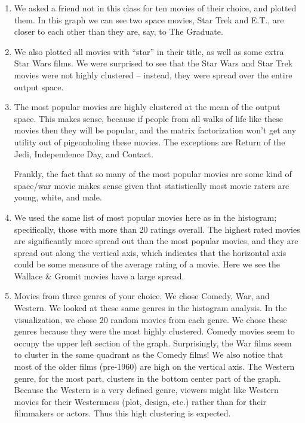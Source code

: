 \begin{enumerate}
    \item We asked a friend not in this class for ten movies of their choice, and plotted them. In this graph we can see two space movies, Star Trek and E.T., are closer to each other than they are, say, to The Graduate.
    \item We also plotted all movies with ``star'' in their title, as well as some extra Star Wars films. We were surprised to see that the Star Wars and Star Trek movies were not highly clustered -- instead, they were spread over the entire output space.
    \newpage
    \item The most popular movies are highly clustered at the mean of the output space. This makes sense, because if people from all walks of life like these movies then they will be popular, and the matrix factorization won't get any utility out of pigeonholing these movies. The exceptions are Return of the Jedi, Independence Day, and Contact.

    Frankly, the fact that so many of the most popular movies are some kind of space/war movie makes sense given that statistically most movie raters are young, white, and male.
    \newpage
    \item We used the same list of most popular movies here as in the histogram; specifically, those with more than 20 ratings overall. The highest rated movies are significantly more spread out than the most popular movies, and they are spread out along the vertical axis, which indicates that the horizontal axis could be some measure of the average rating of a movie. Here we see the Wallace \& Gromit movies have a large spread.
    \item Movies from three genres of your choice.  We chose Comedy, War, and Western. We looked at these same genres in the histogram analysis. In the visualization, we chose 20 random movies from each genre.
    We chose these genres because they were the most highly clustered. Comedy movies seem to occupy the upper left section of the graph. Surprisingly, the War films seem to cluster in the same quadrant as the Comedy films! We also notice that most of the older films (pre-1960) are high on the vertical axis.
    The Western genre, for the most part, clusters in the bottom center part of the graph. Because the Western is a very defined genre, viewers might like Western movies for their Westernness (plot, design, etc.) rather than for their filmmakers or actors. Thus this high clustering is expected.
\end{enumerate}



